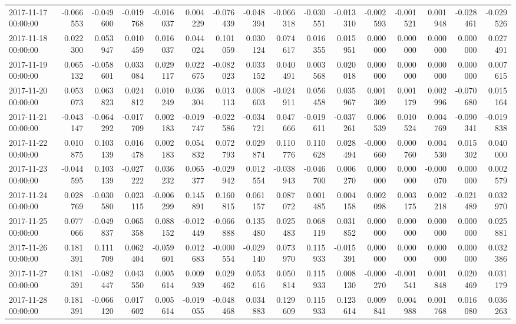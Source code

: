 \begin{tabular}{lrrrrrrrrrrrrrrr}
2017-11-17 00:00:00 & -0.066553 & -0.049600 & -0.019768 & -0.016037 & 0.004229 & -0.076439 & -0.048394 & -0.066318 & -0.030551 & -0.013310 & -0.002593 & -0.001521 & 0.001948 & -0.028461 & -0.029526 \\
2017-11-18 00:00:00 & 0.022300 & 0.053947 & 0.010459 & 0.016037 & 0.044024 & 0.101059 & 0.030124 & 0.074617 & 0.016355 & 0.015951 & 0.000000 & 0.000000 & 0.000000 & 0.000000 & 0.027491 \\
2017-11-19 00:00:00 & 0.065132 & -0.058601 & 0.033084 & 0.029117 & 0.022675 & -0.082023 & 0.033152 & 0.040491 & 0.003568 & 0.020018 & 0.000000 & 0.000000 & 0.000000 & 0.000000 & 0.007615 \\
2017-11-20 00:00:00 & 0.053073 & 0.063823 & 0.024812 & 0.010249 & 0.036304 & 0.013113 & 0.008603 & -0.024911 & 0.056458 & 0.035967 & 0.001309 & 0.001179 & 0.002996 & -0.070680 & 0.015164 \\
2017-11-21 00:00:00 & -0.043147 & -0.064292 & -0.017709 & 0.002183 & -0.019747 & -0.022586 & -0.034721 & 0.047666 & -0.019611 & -0.037261 & 0.006539 & 0.010524 & 0.004769 & -0.090341 & -0.019838 \\
2017-11-22 00:00:00 & 0.010875 & 0.103139 & 0.016478 & 0.002183 & 0.054832 & 0.072793 & 0.029874 & 0.110776 & 0.110628 & 0.028494 & -0.000660 & 0.000760 & 0.004530 & 0.015302 & 0.040000 \\
2017-11-23 00:00:00 & -0.044595 & 0.103139 & -0.027222 & 0.036232 & 0.065377 & -0.029942 & 0.012554 & -0.038943 & -0.046700 & 0.006270 & 0.000000 & 0.000000 & -0.000070 & 0.000000 & 0.002579 \\
2017-11-24 00:00:00 & 0.028769 & -0.030580 & 0.023115 & -0.006299 & 0.145891 & 0.160815 & 0.061157 & 0.087072 & 0.001485 & 0.004158 & 0.002098 & 0.003175 & 0.002218 & -0.021489 & 0.032970 \\
2017-11-25 00:00:00 & 0.077066 & -0.049837 & 0.065358 & 0.088152 & -0.012449 & -0.066888 & 0.135480 & 0.025483 & 0.068119 & 0.031852 & 0.000000 & 0.000000 & 0.000000 & 0.000000 & 0.025881 \\
2017-11-26 00:00:00 & 0.181391 & 0.111709 & 0.062404 & -0.059601 & 0.012683 & -0.000554 & -0.029140 & 0.073970 & 0.115933 & -0.015391 & 0.000000 & 0.000000 & 0.000000 & 0.000000 & 0.032386 \\
2017-11-27 00:00:00 & 0.181391 & -0.082447 & 0.043550 & 0.005614 & 0.009939 & 0.029462 & 0.053616 & 0.050814 & 0.115933 & 0.008130 & -0.000270 & -0.001541 & 0.001848 & 0.020469 & 0.031179 \\
2017-11-28 00:00:00 & 0.181391 & -0.066120 & 0.017602 & 0.005614 & -0.019055 & -0.048468 & 0.034883 & 0.129609 & 0.115933 & 0.123614 & 0.009841 & 0.004988 & 0.001768 & 0.016080 & 0.036263 \\

\end{tabular}
